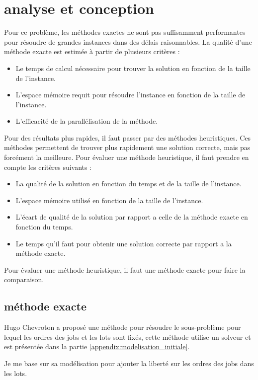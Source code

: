 \chapter{analyse et conception}

Pour ce problème, les méthodes exactes ne sont pas suffisamment performantes pour résoudre de grandes instances dans des délais raisonnables.
La qualité d'une méthode exacte est estimée à partir de plusieurs critères :
\begin{itemize}
	\item Le temps de calcul nécessaire pour trouver la solution en fonction de la taille de l'instance.
	\item L'espace mémoire requit pour résoudre l'instance en fonction de la taille de l'instance.
	\item L'efficacité de la parallélisation de la méthode.
\end{itemize}
Pour des résultats plus rapides, il faut passer par des méthodes heuristiques.
Ces méthodes permettent de trouver plus rapidement une solution correcte, mais pas forcément la meilleure.
Pour évaluer une méthode heuristique, il faut prendre en compte les critères suivants :
\begin{itemize}
	\item La qualité de la solution en fonction du temps et de la taille de l'instance.
	\item L'espace mémoire utilisé en fonction de la taille de l'instance.
	\item L'écart de qualité de la solution par rapport a celle de la méthode exacte en fonction du temps.
	\item Le temps qu'il faut pour obtenir une solution correcte par rapport a la méthode exacte.
\end{itemize}
Pour évaluer une méthode heuristique, il faut une méthode exacte pour faire la comparaison.

\section{méthode exacte}
\label{section:analyse:methode_exacte}
Hugo Chevroton a proposé une méthode pour résoudre le sous-problème pour lequel les ordres des jobs et les lots sont fixés,
cette méthode utilise un solveur et est présentée dans la partie \autoref{appendix:modelisation_initiale}.

Je me base sur sa modélisation pour ajouter la liberté sur les ordres des jobs dans les lots.

